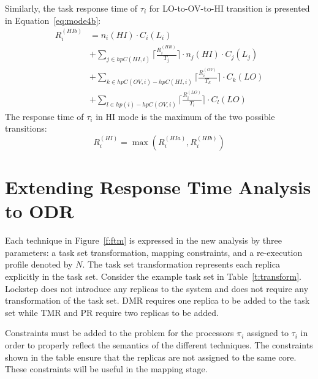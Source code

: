 \documentclass[conference]{IEEEtran}
\begin{document}
Similarly, the task response time of $\tau_i$ for LO-to-OV-to-HI transition is presented in Equation~\eqref{eq:mode4b}:
\begin{equation}\label{eq:mode4b}
\begin{aligned}
R_i^{(HIb)} & = n_i(HI) \cdot C_i(L_i) \\
&  +\sum_{j \in hpC(HI,i)}\Big\lceil\frac{R_i^{(HIb)}}{T_j}\Big\rceil \cdot n_j(HI) \cdot C_j(L_j) \\
&  +\sum_{k \in hpC(OV,i)-hpC(HI,i)}\Big\lceil\frac{R_i^{(OV)}}{T_k}\Big\rceil \cdot C_k(LO)\\
&  +\sum_{l \in hp(i)-hpC(OV,i)}\Big\lceil\frac{R_i^{(LO)}}{T_l}\Big\rceil \cdot C_l(LO)
\end{aligned}
\end{equation}
The response time of $\tau_i$ in HI mode is the maximum of the two possible transitions:
\begin{equation}
R_i^{(HI)}= \max(R_i^{(HIa)},R_i^{(HIb)})
\label{eq:mode4}
\end{equation}



\section{Extending Response Time Analysis to ODR}
\label{s:multicorerta}
	Each technique in Figure~\ref{f:ftm} is expressed in the new analysis by three parameters: a task set transformation, mapping constraints, and a re-execution profile denoted by $N$.
	The task set transformation represents each replica explicitly in the task set. 
	Consider the example task set in Table~\ref{t:transform}. 
	Lockstep does not introduce any replicas to the system and does not require any transformation of the task set. 
	DMR requires one replica to be added to the task set while TMR and PR require two replicas to be added.
	
	Constraints must be added to the problem for the processors $\pi_i$ assigned to $\tau_i$ in order to properly reflect the semantics of the different techniques. 
	The constraints shown in the table ensure that the replicas are not assigned to the same core. 
	These constraints will be useful in the mapping stage.
	
\end{document}
